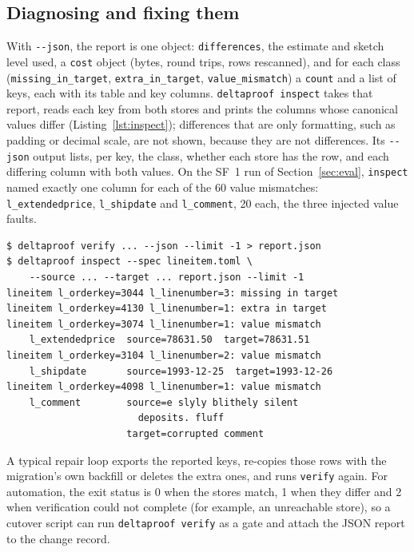 \documentclass[conference]{IEEEtran}
\begin{document}
\subsection{Diagnosing and fixing them}
With \texttt{-{}-json}, the report is one object: \texttt{differences}, the estimate and sketch level used, a \texttt{cost} object (bytes, round trips, rows rescanned), and for each class (\texttt{missing\_in\_target}, \texttt{extra\_in\_target}, \texttt{value\_mismatch}) a \texttt{count} and a list of keys, each with its table and key columns. \texttt{deltaproof inspect} takes that report, reads each key from both stores and prints the columns whose canonical values differ (Listing~\ref{lst:inspect}); differences that are only formatting, such as padding or decimal scale, are not shown, because they are not differences. Its \texttt{-{}-json} output lists, per key, the class, whether each store has the row, and each differing column with both values. On the SF~1 run of Section~\ref{sec:eval}, \texttt{inspect} named exactly one column for each of the 60 value mismatches: \texttt{l\_extendedprice}, \texttt{l\_shipdate} and \texttt{l\_comment}, 20 each, the three injected value faults.

\begin{lstlisting}[caption={Diagnosing reported keys at SF~1 (excerpt)}, label={lst:inspect}]
$ deltaproof verify ... --json --limit -1 > report.json
$ deltaproof inspect --spec lineitem.toml \
    --source ... --target ... report.json --limit -1
lineitem l_orderkey=3044 l_linenumber=3: missing in target
lineitem l_orderkey=4130 l_linenumber=1: extra in target
lineitem l_orderkey=3074 l_linenumber=1: value mismatch
    l_extendedprice  source=78631.50  target=78631.51
lineitem l_orderkey=3104 l_linenumber=2: value mismatch
    l_shipdate       source=1993-12-25  target=1993-12-26
lineitem l_orderkey=4098 l_linenumber=1: value mismatch
    l_comment        source=e slyly blithely silent
                       deposits. fluff
                     target=corrupted comment
\end{lstlisting}

A typical repair loop exports the reported keys, re-copies those rows with the migration's own backfill or deletes the extra ones, and runs \texttt{verify} again. For automation, the exit status is 0 when the stores match, 1 when they differ and 2 when verification could not complete (for example, an unreachable store), so a cutover script can run \texttt{deltaproof verify} as a gate and attach the JSON report to the change record.
\end{document}
